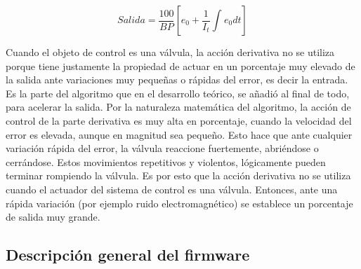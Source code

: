\begin{equation}
 \label{eq:PID sin termino derivativo}
Salida =  \frac{100}{BP} [e_{0}+ \frac{1}{I_{t}} \int_{}^{} e_{0} dt]
\end{equation}

Cuando el objeto de control es una válvula, la acción derivativa no se utiliza porque tiene justamente la propiedad de actuar en un porcentaje muy elevado de la salida ante variaciones muy pequeñas o rápidas del error, es decir la entrada. Es la parte del algoritmo que en el desarrollo teórico, se añadió al final de todo, para acelerar la salida.
Por la naturaleza matemática del algoritmo, la acción de control de la parte derivativa es muy alta en porcentaje, cuando la velocidad del error es elevada, aunque en magnitud sea pequeño. Esto hace que ante cualquier variación rápida del error, la válvula reaccione fuertemente, abriéndose o cerrándose. Estos movimientos repetitivos y violentos, lógicamente pueden terminar rompiendo la válvula. Es por esto que la acción derivativa no se utiliza cuando el actuador del sistema de control es una válvula. Entonces, ante una rápida variación (por ejemplo ruido electromagnético) se establece un porcentaje de salida muy grande. 


\subsection{Descripción general del firmware}
\label{subsec:Descripción del firmware}

